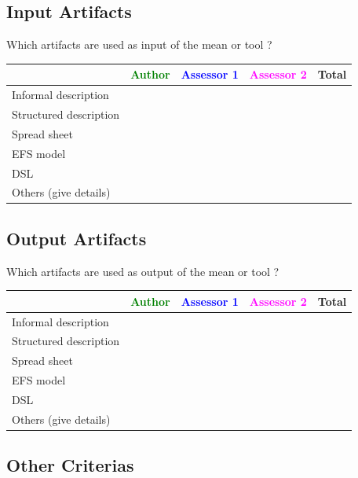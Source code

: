 \subsection{Input Artifacts}

Which artifacts are used as input of the mean or tool  ? 


\begin{tabular}{|l | c | c | c | c|}
\hline
& \textcolor{green}{Author} & \textcolor{blue}{Assessor 1} & \textcolor{magenta}{Assessor 2} & Total \\
\hline 
Informal description & & & &  \\
\hline
Structured description & & & & \\
\hline
Spread sheet & & & & \\
\hline
EFS model & & & & \\
\hline
DSL & & & & \\
\hline
Others (give details) & & & & \\
\hline
\end{tabular}



\subsection{Output Artifacts}

Which artifacts are used as output of the mean or tool  ? 


\begin{tabular}{|l | c | c | c | c|}
\hline
& \textcolor{green}{Author} & \textcolor{blue}{Assessor 1} & \textcolor{magenta}{Assessor 2} & Total \\
\hline 
Informal description & & & &  \\
\hline
Structured description & & & & \\
\hline
Spread sheet & & & & \\
\hline
EFS model & & & & \\
\hline
DSL & & & & \\
\hline
Others (give details) & & & & \\
\hline
\end{tabular}


\subsection{Other Criterias}

